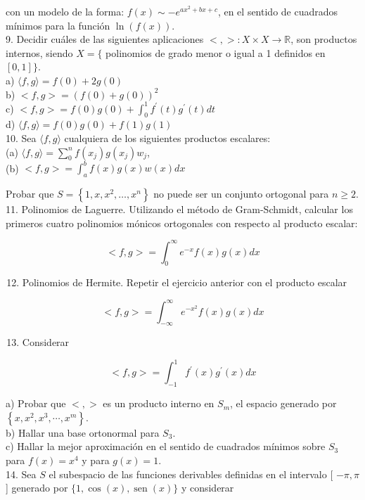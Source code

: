 \documentclass[10pt]{book}
\begin{document}
con un modelo de la forma: $f(x) \sim-e^{a x^{2}+b x+c}$, en el sentido de cuadrados mínimos para la función $\ln (f(x))$.\\
9. Decidir cuáles de las siguientes aplicaciones $<,>: X \times X \rightarrow \mathbb{R}$, son productos internos, siendo $X=\{$ polinomios de grado menor o igual a 1 definidos en $[0,1]\}$.\\
a) $\langle f, g\rangle=f(0)+2 g(0)$\\
b) $<f, g>=(f(0)+g(0))^{2}$\\
c) $<f, g>=f(0) g(0)+\int_{0}^{1} f^{\prime}(t) g^{\prime}(t) d t$\\
d) $\langle f, g\rangle=f(0) g(0)+f(1) g(1)$\\
10. Sea $\langle f, g\rangle$ cualquiera de los siguientes productos escalares:\\
(a) $\langle f, g\rangle=\sum_{0}^{n} f\left(x_{j}\right) g\left(x_{j}\right) w_{j}$,\\
(b) $<f, g>=\int_{a}^{b} f(x) g(x) w(x) d x$

Probar que $S=\left\{1, x, x^{2}, \ldots, x^{n}\right\}$ no puede ser un conjunto ortogonal para $n \geq 2$.\\
11. Polinomios de Laguerre. Utilizando el método de Gram-Schmidt, calcular los primeros cuatro polinomios mónicos ortogonales con respecto al producto escalar:

$$
<f, g>=\int_{0}^{\infty} e^{-x} f(x) g(x) d x
$$

\begin{enumerate}
  \setcounter{enumi}{11}
  \item Polinomios de Hermite. Repetir el ejercicio anterior con el producto escalar
\end{enumerate}

$$
<f, g>=\int_{-\infty}^{\infty} e^{-x^{2}} f(x) g(x) d x
$$

\begin{enumerate}
  \setcounter{enumi}{12}
  \item Considerar
\end{enumerate}

$$
<f, g>=\int_{-1}^{1} f^{\prime}(x) g^{\prime}(x) d x
$$

a) Probar que $<,>$ es un producto interno en $S_{m}$, el espacio generado por $\left\{x, x^{2}, x^{3}, \cdots, x^{m}\right\}$.\\
b) Hallar una base ortonormal para $S_{3}$.\\
c) Hallar la mejor aproximación en el sentido de cuadrados mínimos sobre $S_{3}$ para $f(x)=x^{4}$ y para $g(x)=1$.\\
14. Sea $S$ el subespacio de las funciones derivables definidas en el intervalo [ $-\pi, \pi$ ] generado por $\{1, \cos (x), \operatorname{sen}(x)\}$ y considerar
\end{document}
